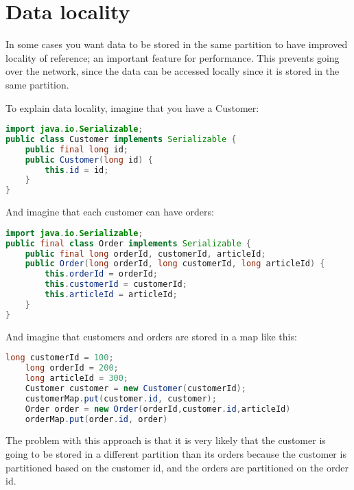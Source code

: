 \section{Data locality}
In some cases you want data to be stored in the same partition to have improved locality of reference; an important feature for performance. This prevents going over the network, since the data can be accessed locally since it is stored in the same partition.

To explain data locality, imagine that you have a Customer:
\begin{lstlisting}[language=java]
import java.io.Serializable;
public class Customer implements Serializable {
    public final long id;
    public Customer(long id) {
        this.id = id;
    }
}
\end{lstlisting}
And imagine that each customer can have orders:
\begin{lstlisting}[language=java]
import java.io.Serializable;
public final class Order implements Serializable {
    public final long orderId, customerId, articleId;
    public Order(long orderId, long customerId, long articleId) {
        this.orderId = orderId;
        this.customerId = customerId;
        this.articleId = articleId;
    }
}
\end{lstlisting}
And imagine that customers and orders are stored in a map like this:
\begin{lstlisting}[language=java]
    long customerId = 100;
    long orderId = 200;
    long articleId = 300;
    Customer customer = new Customer(customerId);
    customerMap.put(customer.id, customer);
    Order order = new Order(orderId,customer.id,articleId)
	orderMap.put(order.id, order)
\end{lstlisting}
The problem with this approach is that it is very likely that the customer is going to be stored in a different partition than its orders because the customer is partitioned based on the customer id, and the orders are partitioned on the order id.

